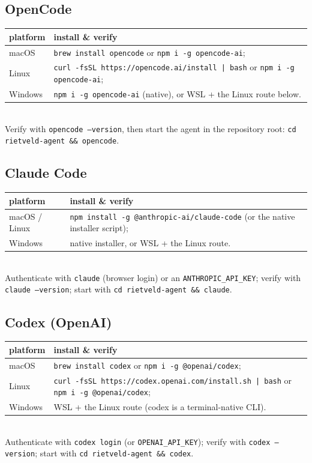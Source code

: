 \documentclass[11pt,a4paper]{article}
\begin{document}
\subsection{OpenCode}
\begin{tabular}{@{}lp{10.4cm}@{}}
\toprule
platform & install \& verify \\
\midrule
macOS & \texttt{brew install opencode} or \texttt{npm i -g opencode-ai}; \\
Linux & \texttt{curl -fsSL https://opencode.ai/install | bash} or
\texttt{npm i -g opencode-ai}; \\
Windows & \texttt{npm i -g opencode-ai} (native), or WSL + the Linux
route below.\\
\bottomrule
\end{tabular}\\[2mm]
Verify with \texttt{opencode --version}, then start the agent in the
repository root: \texttt{cd rietveld-agent \&\& opencode}.

\subsection{Claude Code}
\begin{tabular}{@{}lp{10.4cm}@{}}
\toprule
platform & install \& verify \\
\midrule
macOS / Linux & \texttt{npm install -g @anthropic-ai/claude-code}
(or the native installer script); \\
Windows & native installer, or WSL + the Linux route. \\
\bottomrule
\end{tabular}\\[2mm]
Authenticate with \texttt{claude} (browser login) or an
\texttt{ANTHROPIC\_}\allowbreak\texttt{API\_KEY}; verify with \texttt{claude --version};
start with \texttt{cd rietveld-agent \&\& claude}.

\subsection{Codex (OpenAI)}
\begin{tabular}{@{}lp{10.4cm}@{}}
\toprule
platform & install \& verify \\
\midrule
macOS & \texttt{brew install codex} or \texttt{npm i -g @openai/codex}; \\
Linux & \texttt{curl -fsSL https://codex.openai.com/install.sh | bash}
or \texttt{npm i -g @openai/codex}; \\
Windows & WSL + the Linux route (codex is a terminal-native CLI). \\
\bottomrule
\end{tabular}\\[2mm]
Authenticate with \texttt{codex login} (or \texttt{OPENAI\_API\_KEY});
verify with \texttt{codex --version}; start with
\texttt{cd rietveld-agent \&\& codex}.
\end{document}
